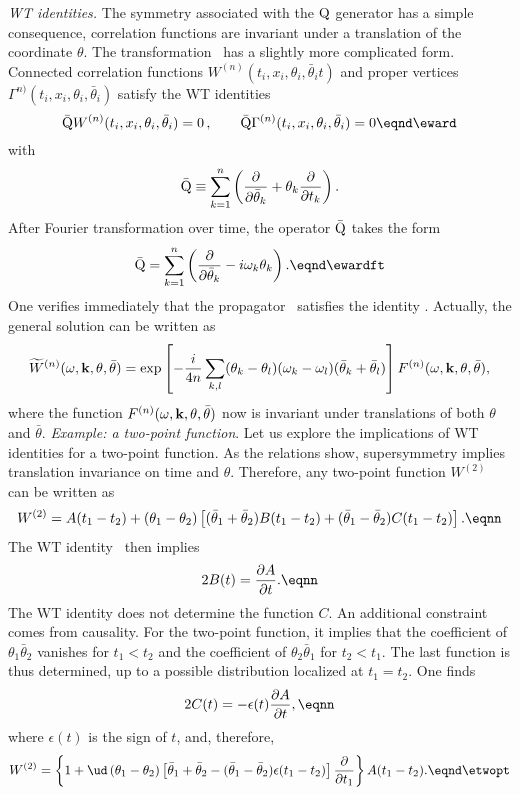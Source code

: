 {\it WT identities.}
The symmetry associated with the $\rm Q$ generator has a simple consequence,
correlation functions are invariant under a translation of the coordinate $
\theta  $. The transformation \esuptr\ has a slightly more complicated
form. Connected correlation functions $W^{ (n )} (t_i,x_i ,
\theta_i ,\bar\theta _i  t)$ and proper vertices
$\Gamma^{  n  )}  (t_i,x_i , \theta_i ,\bar\theta_i
 )$   satisfy  the WT identities  \sslbl\sssStfWT
$$ \bar{\rm Q} W^{ (n )} (t_i,x_i , \theta_i ,\bar\theta_i   )=0\,, \qquad  \bar{\rm Q}\Gamma^{ (n )} (t_i,x_i , \theta_i ,\bar\theta_i   )=0
\eqnd\eward $$
with
$$ \bar{\rm Q}\equiv\sum^{n}_{k=1} \left({\partial \over \partial
\bar\theta_{k}}+\theta_{k}{ \partial \over \partial t_k} \right). $$
After Fourier transformation over time, the operator $\bar{\rm Q}$
takes the form
$$\bar{\rm Q}= \sum^{n}_{k=1} \left({ \partial  \over \partial  \bar\theta
_{k}}-i\omega_{k}\theta_{k} \right).\eqnd\ewardft $$
One verifies  immediately that the propagator \eprop\ satisfies the identity
\eward.
Actually, the general solution can be written as
$$\widetilde W^{(n)}(\omega, {\bf k},\theta,\bar\theta)
=\exp\left[-{i\over4n}\sum_{k,l}(\theta_k-\theta_l)
(\omega_k-\omega_l)
(\bar\theta_k+\bar\theta_l)\right]F^{(n)}(\omega,
{\bf k},\theta,\bar\theta) ,$$ where the function $F^{(n)}(\omega,
{\bf k},\theta,\bar\theta)$ now is invariant under translations of
both $\theta$ and $\bar\theta$.
\medskip
{\it Example: a two-point function}. Let us explore the implications of WT identities for a two-point function. As the relations \eqns{\egensup,\erelant}
show, supersymmetry implies translation invariance on time and $\theta$.
Therefore, any two-point function $W^{(2)}$ can be written as
$$W^{(2)}= A ( t_1 -t_2 ) +  ( \theta_1 - \theta_2
 ) \left[  ( \bar\theta_1 + \bar\theta_2  )B ( t_1 -t_2  ) +
 ( \bar\theta_1 - \bar\theta_2  )C ( t_1 -t_2 )\right] .\eqnn $$
The WT identity \eward\ then implies
$$2B(t) = {\partial A \over \partial t}.\eqnn $$
The WT identity does not determine  the function $C$. An
additional constraint comes from causality. For the two-point
function, it implies that the coefficient of $\theta_1
\bar\theta_2$ vanishes for $t_1 < t_2$ and the coefficient of
$\theta_2 \bar\theta_1$ for $t_2 < t_1$. The last function is thus
determined, up to a possible distribution localized at $t_1 =
t_2$. One  finds
$$2C(t)= - \epsilon(t) {\partial A \over \partial t}, \eqnn $$
where $\epsilon(t)$ is the sign of $t$, and, therefore,
$$W^{(2)}= \left\lbrace 1+ \ud \left(\theta_1 -\theta_2 \right)
\left[ \bar\theta_1 +\bar\theta_2 -  (\bar\theta_1 -\bar\theta_2  )\epsilon
 (t_1-t_2 ) \right]{\partial \over \partial t_1 }
\right\rbrace  A ( t_1-t_2 ).\eqnd\etwopt $$
